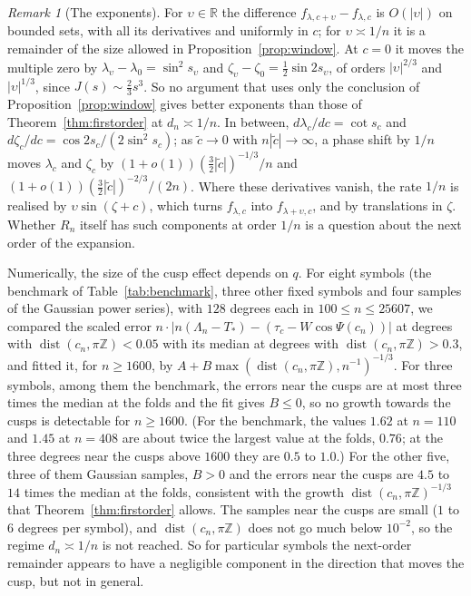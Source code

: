 \documentclass[11pt]{amsart}
\theoremstyle{definition}
\theoremstyle{remark}
\newtheorem{remark}[theorem]{Remark}
\numberwithin{equation}{section}
\newcommand{\R}{\mathbb{R}}
\newcommand{\Z}{\mathbb{Z}}
\DeclareMathOperator{\dist}{dist}
\begin{document}
\begin{remark}[The exponents]\label{rem:sharp}
For $\upsilon\in\R$ the difference $f_{\lambda,c+\upsilon}-f_{\lambda,c}$ is $O(|\upsilon|)$ on bounded sets, with all its
derivatives and uniformly in $c$; for $\upsilon\asymp1/n$ it is a remainder of the size allowed in
Proposition~\ref{prop:window}. At $c=0$ it moves the multiple zero by $\lambda_\upsilon-\lambda_0=\sin^2s_\upsilon$ and
$\zeta_\upsilon-\zeta_0=\frac12\sin2s_\upsilon$, of orders $|\upsilon|^{2/3}$ and $|\upsilon|^{1/3}$, since $J(s)\sim\frac23s^3$. So no
argument that uses only the conclusion of Proposition~\ref{prop:window} gives better exponents than those of
Theorem~\ref{thm:firstorder} at $d_n\asymp1/n$. In between, $d\lambda_c/dc=\cot s_c$ and
$d\zeta_c/dc=\cos2s_c/(2\sin^2s_c)$; as $\tilde c\to0$ with $n|\tilde c|\to\infty$, a phase shift by $1/n$ moves
$\lambda_c$ and $\zeta_c$ by $(1+o(1))(\frac32|\tilde c|)^{-1/3}/n$ and $(1+o(1))(\frac32|\tilde c|)^{-2/3}/(2n)$. Where
these derivatives vanish, the rate $1/n$ is realised by $\upsilon\sin(\zeta+c)$, which turns $f_{\lambda,c}$ into
$f_{\lambda+\upsilon,c}$, and by translations in $\zeta$. Whether $R_n$ itself has such components at order $1/n$ is a
question about the next order of the expansion.

Numerically, the size of the cusp effect depends on $q$. For eight symbols (the benchmark of
Table~\ref{tab:benchmark}, three other fixed symbols and four samples of the Gaussian power series), with $128$
degrees each in $100\le n\le25607$, we compared the scaled error $n\cdot|n(\Lambda_n-T_*)-(\tau_c-W\cos\Psi(c_n))|$ at
degrees with $\dist(c_n,\pi\Z)<0.05$ with its median at degrees with $\dist(c_n,\pi\Z)>0.3$, and fitted it, for
$n\ge1600$, by $A+B\max(\dist(c_n,\pi\Z),n^{-1})^{-1/3}$. For three symbols, among them the benchmark, the errors near
the cusps are at most three times the median at the folds and the fit gives $B\le0$, so no growth towards the cusps is
detectable for $n\ge1600$. (For the benchmark, the values $1.62$ at $n=110$ and $1.45$ at $n=408$ are about twice the
largest value at the folds, $0.76$; at the three degrees near the cusps above $1600$ they are $0.5$ to $1.0$.) For the
other five, three of them Gaussian samples, $B>0$
and the errors near the cusps are $4.5$ to $14$ times the median at the folds, consistent with the growth
$\dist(c_n,\pi\Z)^{-1/3}$ that Theorem~\ref{thm:firstorder} allows. The samples near the cusps are small ($1$ to $6$
degrees per symbol), and $\dist(c_n,\pi\Z)$ does not go much below $10^{-2}$, so the regime $d_n\asymp1/n$ is not
reached. So for particular symbols the next-order remainder appears to have a negligible component in the direction
that moves the cusp, but not in general.
\end{remark}
\end{document}
